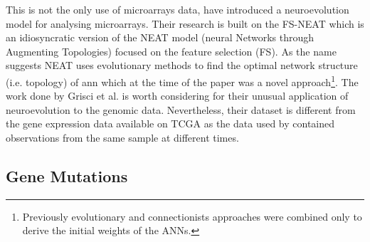 This is not the only use of microarrays data, \citet{Grisci2019-xn} have introduced a neuroevolution model for analysing microarrays. Their research is built on the FS-NEAT\cite{Whiteson2005-dn} which is an idiosyncratic version of the NEAT model (neural Networks through Augmenting Topologies)\cite{Stanley2002-tg} focused on the feature selection (FS). As the name suggests NEAT\cite{Stanley2002-tg} uses evolutionary methods to find the optimal network structure (i.e. topology) of \acrshort{ann} which at the time of the paper was a novel approach\footnote{Previously evolutionary and connectionists approaches were combined only to derive the initial weights of the ANNs.}. The work done by Grisci et al. is worth considering for their unusual application of neuroevolution to the genomic data. Nevertheless, their dataset is different from the gene expression data available on TCGA as the data used by \citet{Grisci2019-xn} contained observations from the same sample at different times.



\subsection{Gene Mutations} \label{s:lit:mutations}

\vspace{3mm}
\vspace{3mm}


